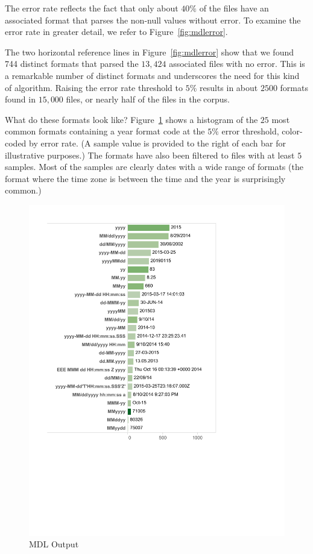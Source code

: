The error rate reflects the fact that only about $40\%$ of the files have an associated format that parses the non-null values without error. To examine the error rate in greater detail, we refer to Figure~\ref{fig:mdlerror}.

The two horizontal reference lines in Figure~\ref{fig:mdlerror} show that we found 744 distinct formats that parsed the $13,424$ associated files with no error. 
This is a remarkable number of distinct formats and underscores the need for this kind of algorithm. 
Raising the error rate threshold to $5\%$ results in about $2500$ formats found in $15,000$ files, or nearly half of the files in the corpus. 

What do these formats look like? Figure~\ref{fig:mdloutput} shows a histogram of the $25$ most common formats containing a year format code at the $5\%$ error threshold, color-coded by error rate. (A sample value is provided to the right of each bar for illustrative purposes.) The formats have also been filtered to files with at least $5$ samples. Most of the samples are clearly dates with a wide range of formats (the format where the time zone is between the time and the year is surprisingly common.)
 
\begin{figure}[ht]
\centering
\includegraphics[width=\columnwidth]{figures/FigureM3}
\caption{MDL Output}
\label{fig:mdloutput}
\end{figure}

